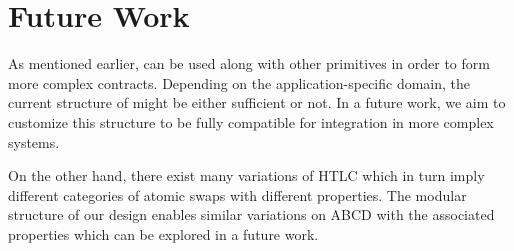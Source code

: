 \section{Future Work}

As mentioned earlier, \abcd can be used along with other primitives in order to form more complex contracts. Depending on the application-specific domain, the current structure of \abcd might be either sufficient or not. In a future work, we aim to customize this structure to be fully compatible for integration in more complex systems.

On the other hand, there exist many variations of HTLC which in turn imply different categories of atomic swaps with different properties. The modular structure of our design enables similar variations on ABCD with the associated properties which can be explored in a future work.  